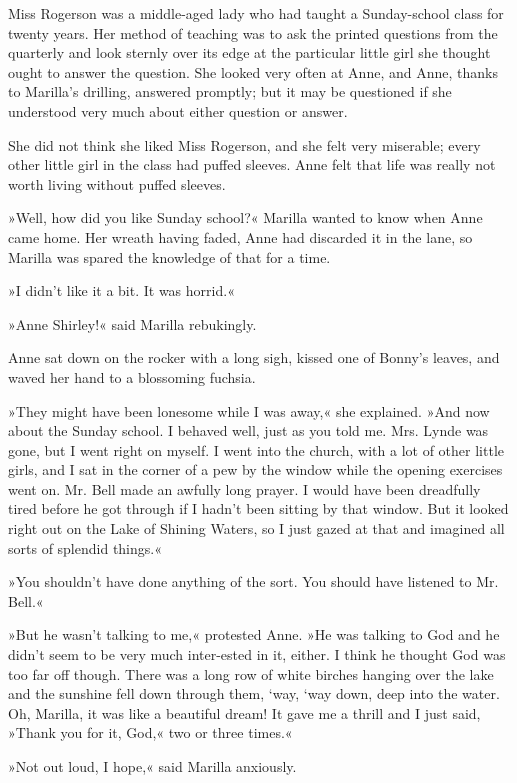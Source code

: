 Miss Rogerson was a middle-aged lady who had taught a Sunday-school class for twenty years. Her method of teaching was to ask the printed questions from the quarterly and look sternly over its edge at the particular little girl she thought ought to answer the question. She looked very often at Anne, and Anne, thanks to Marilla's drilling, answered promptly; but it may be questioned if she understood very much about either question or answer.

She did not think she liked Miss Rogerson, and she felt very miserable; every other little girl in the class had puffed sleeves. Anne felt that life was really not worth living without puffed sleeves.

»Well, how did you like Sunday school?« Marilla wanted to know when Anne came home. Her wreath having faded, Anne had discarded it in the lane, so Marilla was spared the knowledge of that for a time.

»I didn't like it a bit. It was horrid.«

»Anne Shirley!« said Marilla rebukingly.

Anne sat down on the rocker with a long sigh, kissed one of Bonny's leaves, and waved her hand to a blossoming fuchsia.

»They might have been lonesome while I was away,« she explained. »And now about the Sunday school. I behaved well, just as you told me. Mrs. Lynde was gone, but I went right on myself. I went into the church, with a lot of other little girls, and I sat in the corner of a pew by the window while the opening exercises went on. Mr. Bell made an awfully long prayer. I would have been dreadfully tired before he got through if I hadn't been sitting by that window. But it looked right out on the Lake of Shining Waters, so I just gazed at that and imagined all sorts of splendid things.«

»You shouldn't have done anything of the sort. You should have listened to Mr. Bell.«

»But he wasn't talking to me,« protested Anne. »He was talking to God and he didn't seem to be very much inter-ested in it, either. I think he thought God was too far off though. There was a long row of white birches hanging over the lake and the sunshine fell down through them, ‘way, ‘way down, deep into the water. Oh, Marilla, it was like a beautiful dream! It gave me a thrill and I just said, »Thank you for it, God,« two or three times.«

»Not out loud, I hope,« said Marilla anxiously.

